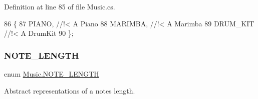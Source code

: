 Definition at line 85 of file Music.\+cs.


\begin{DoxyCode}
86     \{
87         PIANO, \textcolor{comment}{//!< A Piano}
88 \textcolor{comment}{}        MARIMBA, \textcolor{comment}{//!< A Marimba}
89 \textcolor{comment}{}        DRUM\_KIT \textcolor{comment}{//!< A DrumKit}
90 \textcolor{comment}{}    \};
\end{DoxyCode}
\mbox{\label{group___music_enums_gaf11b5f079adbb21c800b9eca1c5c3cbd}} 
\subsubsection{\texorpdfstring{N\+O\+T\+E\+\_\+\+L\+E\+N\+G\+TH}{NOTE\_LENGTH}}
{\footnotesize\ttfamily enum \hyperlink{group___music_enums_gaf11b5f079adbb21c800b9eca1c5c3cbd}{Music.\+N\+O\+T\+E\+\_\+\+L\+E\+N\+G\+TH}\hspace{0.3cm}{\ttfamily [strong]}}



Abstract representations of a note\textquotesingle{}s length. 

